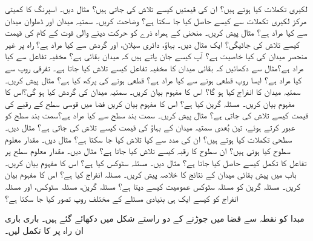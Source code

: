 لکیری تکملات کیا ہوتے ہیں؟ ان کی قیمتیں کیسے تلاش کی جاتی ہیں؟ مثال دیں۔
اسپرنگ کا کمیتی مرکز لکیری تکملات سے کیسے حاصل کیا جا سکتا ہے؟  وضاحت کریں۔
سمتیہ میدان   اور  ڈھلوان میدان  سے کیا مراد ہے؟ مثال پیش کریں۔
منحنی کے ہمراہ   ذرے کو حرکت دینے والی قوت کے کام کی قیمت کیسے تلاش کی جائیگی؟ ایک مثال دیں۔
بہاؤ، دائری سیلان، اور گردش سے کیا مراد ہے؟
راہ پر غیر منحصر میدان کی کیا خاصیت ہے؟
آپ کیسے جان پاتے ہیں کہ  میدان بقائی ہے؟
مخفیہ تفاعل سے کیا مراد ہے؟مثال سے دکھائیں  کہ بقائی میدان کا مخفیہ تفاعل کیسے تلاش کیا جاتا ہے۔
تفرقی روپ سے کیا مراد ہے؟ ایسا  روپ  قطعی ہونے سے کیا مراد ہے؟ قطعی ہونے کی پرکھ کیا ہے؟ مثال پیش کریں۔
سمتیہ میدان کا   انفراج کیا ہو گا؟ اس کا  مفہوم بیان کریں۔
سمتیہ میدان کی گردش کیا ہو گی؟اس کا مفہوم بیان کریں۔
مسئلہ گرین کیا ہے؟ اس کا مفہوم بیان کریں
فضا میں  قوسی سطح کے رقبے کی قیمت کیسے تلاش کی جاتی ہے؟ مثال پیش کریں۔
سمت بند سطح سے کیا مراد ہے؟سمت بند سطح کو عبور کرتے ہوئے،  تین بُعدی سمتیہ میدان کے بہاؤ کی قیمت  کیسے  تلاش  کی جاتی ہے؟ مثال دیں۔
سطحی تکملات کیا ہوتے ہیں؟ ان کی مدد سے کیا تلاش کیا جا سکتا ہے؟ مثال دیں۔
مقدار معلوم سطوح کیا ہوتی ہیں؟ ان سطوح کا رقبہ کیسے تلاش کیا جاتا ہے؟ مثال دیں۔
مقدار معلوم سطح پر تفاعل کا تکمل کیسے حاصل کیا جاتا ہے؟ مثال دیں۔
مسئلہ سٹوکس کیا ہے؟ اس  کا مفہوم بیان کریں۔
 باب میں پیش  بقائی میدان کے  نتائج  کا خلاصہ پیش کریں۔
مسئلہ انفراج کیا ہے؟ اس کا مفہوم بیان کریں۔
مسئلہ گرین کو مسئلہ سٹوکس عمومیت کیسے دیتا ہے؟
مسئلہ گرین، مسئلہ سٹوکس، اور مسئلہ انفراج کو کیسے ایک ہی بنیادی مسئلے کے مختلف روپ تصور کیا جا سکتا ہے؟

\setcounter{questioncounter}{0}
مبدا کو نقطہ   سے فضا میں جوڑنے کے دو راستے شکل میں دکھائے گئے ہیں۔ باری باری ان راہ پر  کا تکمل لیں۔

